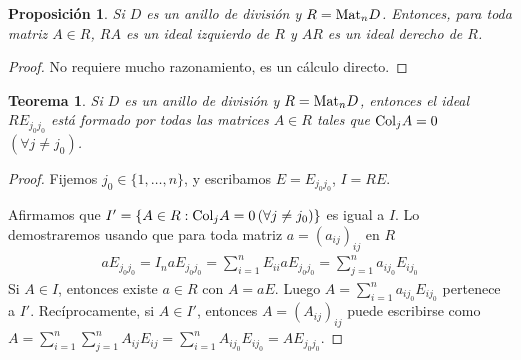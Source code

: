 \documentclass{report}
\newcommand{\Mat}{\textnormal{Mat}}
\newcommand{\Col}{\textnormal{Col}}
\newtheorem{theorem}{Teorema}
\newtheorem{proposition}{Proposición}
\begin{document}
  \begin{proposition}
    Si \(D\) es un anillo de división y \(R = \Mat_n D\).
    Entonces, para toda matriz \(A \in R\), \(R A\) es un ideal izquierdo de \(R\) y \(A R\) es un ideal derecho de \(R\).
  \end{proposition}
  \begin{proof}
    No requiere mucho razonamiento, es un cálculo directo.
  \end{proof}

  \begin{theorem}
    Si \(D\) es un anillo de división y \(R = \Mat_n D\), entonces el ideal \(R E_{j_0 j_0}\) está formado por todas las matrices \(A \in R\) tales que \(\Col_j A = 0\) \((\forall j \neq j_0)\).
  \end{theorem}
  \begin{proof}
    Fijemos \(j_0 \in \{1, \dots, n\}\), y escribamos \(E = E_{j_0 j_0}\), \(I = R E\).

    Afirmamos que \(I' = \{A \in R : \Col_j A = 0 \, (\forall j \neq j_0)\}\) es igual a \(I\).
    Lo demostraremos usando que para toda matriz \(a = (a_{i j})_{i j}\) en \(R\)
    \begin{align}
      a E_{j_0 j_0}
      =
      I_n a E_{j_0 j_0}
      =
      \sum_{i = 1}^n E_{i i} a E_{j_0 j_0}
      =
      \sum_{j = 1}^n a_{i j_0} E_{i j_0}
    \end{align}
    Si \(A \in I\), entonces existe \(a \in R\) con \(A = a E\).
    Luego \(A = \sum_{i = 1}^n a_{i j_0} E_{i j_0}\) pertenece a \(I'\).
    Recíprocamente, si \(A \in I'\), entonces \(A = (A_{i j})_{i j}\) puede escribirse como \(A = \sum_{i = 1}^n \sum_{j = 1}^n A_{i j} E_{i j} = \sum_{i = 1}^n A_{i j_0} E_{i j_0} = A E_{j_0 j_0}\).
  \end{proof}
\end{document}
